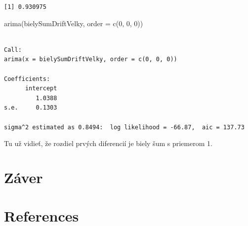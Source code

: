 \documentclass[
  letterpaper,
  DIV=11,
  numbers=noendperiod]{scrreprt}
\newenvironment{Shaded}{\begin{snugshade}}{\end{snugshade}}
\newcommand{\AttributeTok}[1]{\textcolor[rgb]{0.40,0.45,0.13}{#1}}
\newcommand{\DecValTok}[1]{\textcolor[rgb]{0.68,0.00,0.00}{#1}}
\newcommand{\FunctionTok}[1]{\textcolor[rgb]{0.28,0.35,0.67}{#1}}
\newcommand{\NormalTok}[1]{\textcolor[rgb]{0.00,0.23,0.31}{#1}}
\newlength{\cslhangindent}
\newenvironment{CSLReferences}[2] %
 {\begin{list}{}{%
  \setlength{\itemindent}{0pt}
  \setlength{\leftmargin}{0pt}
  \setlength{\parsep}{0pt}
  \ifodd #1
   \setlength{\leftmargin}{\cslhangindent}
   \setlength{\itemindent}{-1\cslhangindent}
  \fi
  \setlength{\itemsep}{#2\baselineskip}}}
 {\end{list}}
\begin{document}
\begin{verbatim}
[1] 0.930975
\end{verbatim}

\begin{Shaded}
\begin{Highlighting}[]
\FunctionTok{arima}\NormalTok{(bielySumDriftVelky, }\AttributeTok{order =} \FunctionTok{c}\NormalTok{(}\DecValTok{0}\NormalTok{, }\DecValTok{0}\NormalTok{, }\DecValTok{0}\NormalTok{))}
\end{Highlighting}
\end{Shaded}

\begin{verbatim}

Call:
arima(x = bielySumDriftVelky, order = c(0, 0, 0))

Coefficients:
      intercept
         1.0388
s.e.     0.1303

sigma^2 estimated as 0.8494:  log likelihood = -66.87,  aic = 137.73
\end{verbatim}

Tu už vidieť, že rozdiel prvých diferencií je biely šum s priemerom 1.


\chapter*{Záver}\label{zuxe1ver}



\chapter*{References}\label{references}


\label{refs}
\begin{CSLReferences}{0}{1}
\end{CSLReferences}
\end{document}
